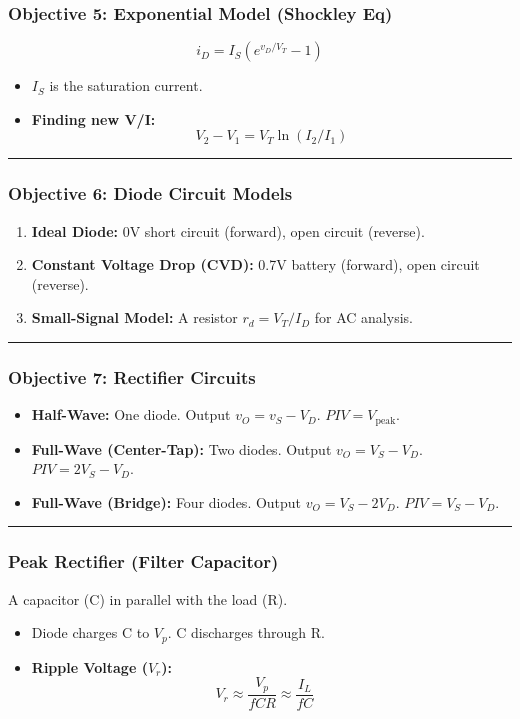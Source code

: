 \documentclass[10pt]{article}
\begin{document}
\begin{multicols}{2}
\subsubsection*{Objective 5: Exponential Model (Shockley Eq)}
\[ i_D = I_S (e^{v_D / V_T} - 1) \]
\begin{itemize}
    \item $I_S$ is the saturation current.
    \item \textbf{Finding new V/I:} \[ V_2 - V_1 = V_T \ln(I_2 / I_1) \]
\end{itemize}

\hrule

\subsubsection*{Objective 6: Diode Circuit Models}
\begin{enumerate}
    \item \textbf{Ideal Diode:} 0V short circuit (forward), open circuit (reverse).
    \item \textbf{Constant Voltage Drop (CVD):} 0.7V battery (forward), open circuit (reverse).
    \item \textbf{Small-Signal Model:} A resistor \( r_d = V_T / I_D \) for AC analysis.
\end{enumerate}

\hrule

\subsubsection*{Objective 7: Rectifier Circuits}
\begin{itemize}
    \item \textbf{Half-Wave:} One diode. Output \( v_O = v_S - V_D \). \( PIV = V_{\text{peak}} \).
    \item \textbf{Full-Wave (Center-Tap):} Two diodes. Output \( v_O = V_S - V_D \). \( PIV = 2V_S - V_D \).
    \item \textbf{Full-Wave (Bridge):} Four diodes. Output \( v_O = V_S - 2V_D \). \( PIV = V_S - V_D \).
\end{itemize}

\hrule

\subsubsection*{Peak Rectifier (Filter Capacitor)}
A capacitor (C) in parallel with the load (R).
\begin{itemize}
    \item Diode charges C to $V_p$. C discharges through R.
    \item \textbf{Ripple Voltage ($V_r$):} \[ V_r \approx \frac{V_p}{fCR} \approx \frac{I_L}{fC} \quad \text{} \]
\end{itemize}


\end{multicols}
\end{document}
